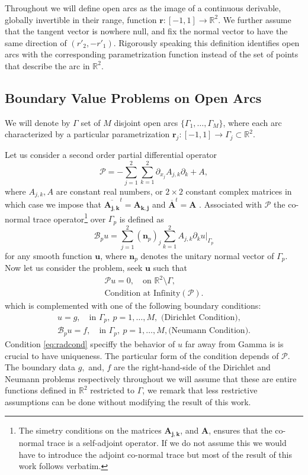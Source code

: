 \documentclass{article}
\newcommand{\cB}{\mathcal B}
\newcommand{\IR}{{\mathbb R}}
\newcommand{\cP}{\mathcal{P}}
\newcommand{\bn}{\bm{n}}
\newcommand{\bu}{\bm{u}}
\newcommand{\br}{\bm{r}}
\begin{document}
Throughout we will define open arcs as the image of a continuous derivable, globally invertible in their range, function $\br : [-1,1] \rightarrow \IR^2$.  We further assume that the tangent vector is nowhere null, and fix the normal vector to have the same direction of $(r'_2,-r'_1)$. Rigorously speaking  this definition identifies open arcs with the corresponding parametrization function instead of the set of points that describe the arc in $\IR^2$. 
\subsection{Boundary Value Problems on Open Arcs}
\label{sec:bvproblem}
We will denote by $\Gamma$ set of $M$ disjoint open arcs $ \{ \Gamma_1, \hdots, \Gamma_M\}$, where  each arc characterized by a particular parametrization $\br_j :[-1,1] \rightarrow \Gamma_j \subset \IR^2$.

Let us consider a second order partial differential operator 
$$\cP = - \sum_{j=1}^2 \sum_{k=1}^2 \partial_{x_j}{A_{j,k}} \partial_k  + {A},$$
where ${A_{j,k}},{A}$ are constant real numbers, or $2\times 2$ constant complex matrices in which case we impose that $\overline{\mathbf{A_{j,k}}}^t = \mathbf{A_{k,j}}$ and $\overline{\mathbf{A}}^t = \mathbf{A}$ . Associated with $\cP$ the co-normal trace operator\footnote{The simetry conditions on the matrices $\mathbf{A_{j,k}}$, and $\mathbf{A}$, ensures that the co-normal trace is a self-adjoint operator. If we do not assume this we would have to introduce the adjoint co-normal trace but most of the result of this work follows verbatim.} over $\Gamma_p$ is defined as 
$$
\cB_p u =  \sum_{j=1}^2 (\bn_p)_j \sum_{k=1}^2 {A}_{j,k} \partial_k u \vert_{\Gamma_p} 
$$
for any smooth function $\bu$, where $\bn_p$ denotes the unitary normal vector of $\Gamma_p$. Now let us consider the problem, seek $\bu$ such that 
\begin{align}
\label{eq:volprob}
\cP u = 0, \quad \text{on } \IR^2 \setminus \Gamma,\\
\label{eq:radcond}
\text{Condition at Infinity}(\cP). 
\end{align}
which is complemented with one of the following boundary conditions: 
\begin{align}
\label{eq:dircond}
u = g,   \quad \text{in } \Gamma_p, \ p =1,\hdots,M,  \text{ (Dirichlet Condition)},\\
\label{eq:neumanncond}
 \cB_p u = f,  \quad \text{in } \Gamma_p, \ p =1,\hdots,M,  \text{(Neumann Condition)}.
\end{align}
Condition \eqref{eq:radcond} speciffy the behavior of $u$ far away from Gamma is is crucial to have uniqueness. The particular form of the condition depends of $\cP$. The boundary data $g,$ and, $f$ are the right-hand-side of the Dirichlet and Neumann problems respectively throughout we will assume that these are entire functions defined in $\IR^2$ restricted to $\Gamma$, we remark that less restrictive assumptions can be done without modifying the result of this work.
\end{document}
